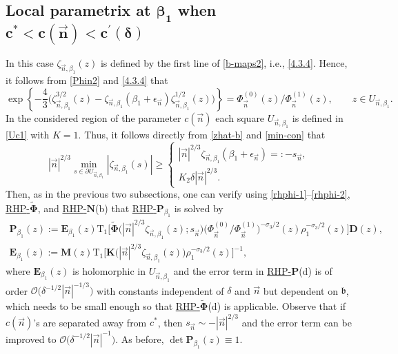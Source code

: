 \documentclass[pdftex]{sigma}
\numberwithin{equation}{section}
\renewcommand{\det}{\operatorname{det}}
\newcommand{\n}{{\vec n}}
\newcommand{\rhn} {\textnormal{RHP}-${\boldsymbol N}$}
\newcommand{\rhp} {\textnormal{RHP}-${\boldsymbol P}$}
\newcommand{\rhwphi} {\textnormal{RHP}-${\widetilde{\boldsymbol \Phi}}$}
\begin{document}
\subsection[Local parametrix at beta\_1 when c\^* < c(n) < c\^prime(delta)]{Local parametrix at $\boldsymbol{\beta_1} $ when $ \boldsymbol{c^* < c(\n) < c^\prime(\delta) }$}


In this case $ \zeta_{\n,\beta_1}(z) $ is defined by the first line of \eqref{b-maps2}, i.e., \eqref{4.3.4}. Hence, it follows from \eqref{Phin2} and \eqref{4.3.4} that
\begin{equation}
\label{rhphi-1}
\exp\left\{ -\frac43 \bigl( \zeta_{\n,\beta_1}^{3/2}(z) - \zeta_{\n,\beta_1}(\beta_1+\epsilon_\n) \zeta_{\n,\beta_1}^{1/2}(z) \bigr) \right\} = \Phi_{\n}^{(0)}(z)/\Phi_{\n}^{(1)}(z), \qquad z\in U_{\n,\beta_1}.
\end{equation}
In the considered region of the parameter $ c(\n) $ each square $ U_{\n,\beta_1} $ is defined in \eqref{Uc1} with $ K=1 $. Thus, it follows directly from \eqref{zhat-b} and \eqref{min-con} that
\begin{equation}
\label{rhphi-2}
|\n|^{2/3}\min_{s\in\partial U_{\n,\beta_1}}|\zeta_{\n,\beta_1}(s)| \geq
\begin{cases}
|\n|^{2/3}\zeta_{\n,\beta_1}(\beta_1+\epsilon_\n) =: -s_\n, \\
K_2 \delta|\n|^{2/3}.
\end{cases}
\end{equation}
Then, as in the previous two subsections, one can verify using \eqref{rhphi-1}--\eqref{rhphi-2}, \hyperref[rhwphi]{\rhwphi}, and \hyperref[rhn]{\rhn}(b) that \hyperref[rhp]{\rhp$_{\beta_1}$} is solved by
\begin{gather*}%
\boldsymbol P_{\beta_1}(z) := \boldsymbol E_{\beta_1}(z) \mathrm{T}_1\big[ \widetilde{\boldsymbol\Phi} \bigl(|\n|^{2/3}\zeta_{\n,\beta_1}(z);s_\n\bigr) \bigl(\Phi^{(0)}_\n/\Phi^{(1)}_\n\bigr)^{-\sigma_3/2}(z)\rho_1^{-\sigma_3/2}(z) \big] \boldsymbol D(z), \\
\boldsymbol E_{\beta_1}(z) := \boldsymbol M(z)\mathrm{T}_1\big[ \boldsymbol K \bigl(|\n|^{2/3}\zeta_{\n,\beta_1}(z)\bigr) \rho_1^{-\sigma_3/2}(z)\big]^{-1},
\end{gather*}
where $\boldsymbol E_{\beta_1}\!(z)$ is holomorphic in $ U_{\n,\beta_1} $ and the error term in \hyperref[rhp]{\rhp}(d) is of order $ \boldsymbol{\mathcal O}\bigl(\delta^{-1/2} |\n|^{-1/3} \bigr) $ with constants independent of $ \delta $ and $ \n $ but dependent on $ \mathfrak b $, which needs to be small enough so that \hyperref[rhwphi]{\rhwphi}(d) is applicable. Observe that if $ c(\n) $'s are separated away from $ c^* $, then $ s_\n \sim -|\n|^{2/3} $ and the error term can be improved to $ \boldsymbol{\mathcal O}\bigl(\delta^{-1/2} |\n|^{-1} \bigr) $. As before, $ \det \boldsymbol P_{\beta_1}(z) \equiv 1 $.
\end{document}
